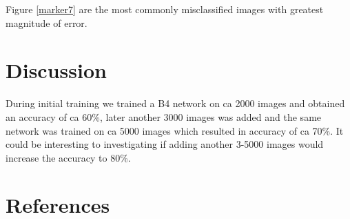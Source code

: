 \documentclass[10pt,letterpaper]{article}
\begin{document}
Figure \ref{marker7} are the most commonly misclassified images 
with greatest magnitude of error.


\section*{Discussion}

During initial training we trained a B4 network on ca 2000 images and obtained
an accuracy of ca 60\%, later another 3000 images was added and the same
network was trained on ca 5000 images which resulted in accuracy of ca 70\%.
It could be interesting to investigating if adding another 3-5000 images
would increase the accuracy to 80\%.


\section*{References}



\end{document}
